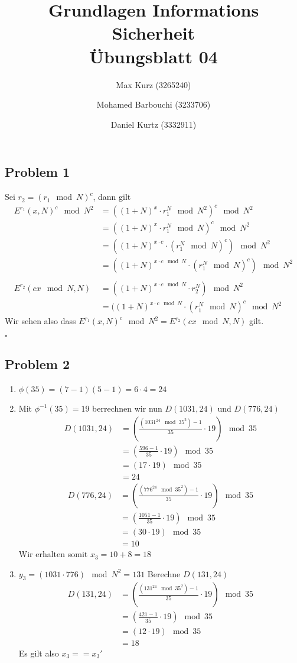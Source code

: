 \documentclass[12pt, german]{article}
\title{Grundlagen Informations Sicherheit \\ Übungsblatt 04}
\author{Max Kurz (3265240)  \and Mohamed Barbouchi (3233706) \and Daniel Kurtz (3332911)}
\date{}
\newcommand{\bewiesen}{\begin{flushright}$\square$ \end{flushright} }
\begin{document}
	\maketitle
    \subsection*{Problem 1}
    Sei $r_2 = (r_1 \mod N)^c$, dann gilt
    \begin{align*}
    E^{r_1}(x,N)^c \mod N^2 &= ((1+N)^x \cdot r_1^N \mod N^2)^c \mod N^2  \\
    &=((1+N)^x \cdot r_1^N \mod N)^c \mod N^2  \\
    &=((1+N)^{x \cdot c} \cdot (r_1^N \mod N)^c) \mod N^2  \\
    &=((1+N)^{x \cdot c \mod N} \cdot (r_1^N \mod N)^c) \mod N^2  \\ \\
    E^{r_2}(cx \mod N,N) &= ((1+N)^{x\cdot c \mod N} \cdot r_2^N) \mod N^2 \\
    &= ((1+N)^{x\cdot c \mod N} \cdot (r_1^N \mod N)^{c} \mod N^2     
    \end{align*}
    Wir sehen also dass $E^{r_1}(x,N)^c \mod N^2 = E^{r_2}(cx \mod N,N)$ gilt.
    \bewiesen
    \newpage
    \subsection*{Problem 2}
   \begin{enumerate}[label=\arabic*.]
   	\item $\phi(35) = (7-1)(5-1) = 6\cdot 4 = 24 $
   	\item  Mit $\phi^{-1}(35) = 19$ berrechnen wir nun $D(1031, 24)$ und $D(776, 24)$
   	\begin{align*}	
   	D(1031, 24) &= \left(\frac{(1031^{24} \mod 35^2) -1}{35} \cdot 19\right) \mod 35 \\
   				&=\left(\frac{596 -1}{35} \cdot 19\right) \mod 35 \\
   				&=(17 \cdot 19) \mod 35 \\
   				&= 24
   	\end{align*}
   	\begin{align*}	
   	D(776, 24) &= \left(\frac{(776^{24} \mod 35^2) -1}{35} \cdot 19\right) \mod 35 \\
   	&=\left(\frac{1051 -1}{35} \cdot 19\right) \mod 35 \\
   	&=(30 \cdot 19) \mod 35 \\
   	&= 10
   	\end{align*}
   	Wir erhalten somit $x_3 = 10 + 8 = 18$
   	\item $y_3 = (1031 \cdot 776) \mod N^2= 131$
   	Berechne $D(131, 24)$
   	\begin{align*}
   		D(131, 24) &= \left(\frac{(131^{24} \mod 35^2) -1}{35} \cdot 19\right) \mod 35 \\
   		&=\left(\frac{421 -1}{35} \cdot 19\right) \mod 35 \\
   		&=(12 \cdot 19) \mod 35 \\
   		&= 18
   	\end{align*}
   	Es gilt also $x_3 == x_3'$
   \end{enumerate}
\end{document}
